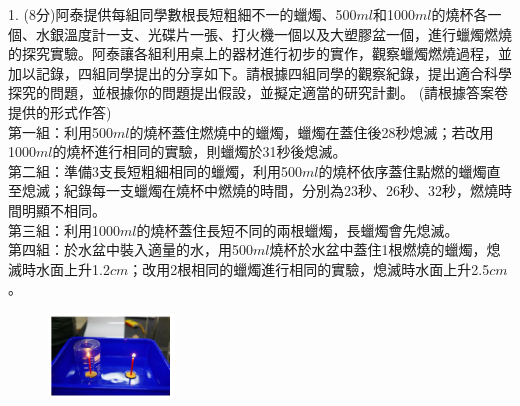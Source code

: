 \documentclass[cn,10pt,math=newtx]{elegantbook}
\begin{document}
\begin{example}
   1. (8分)阿泰提供每組同學數根長短粗細不一的蠟燭、500$ml$和1000$ml$的燒杯各一個、水銀溫度計一支、光碟片一張、打火機一個以及大塑膠盆一個，進行蠟燭燃燒的探究實驗。阿泰讓各組利用桌上的器材進行初步的實作，觀察蠟燭燃燒過程，並加以記錄，四組同學提出的分享如下。請根據四組同學的觀察紀錄，提出適合科學探究的問題，並根據你的問題提出假設，並擬定適當的研究計劃。 (請根據答案卷提供的形式作答)\\
   第一組：利用500$ml$的燒杯蓋住燃燒中的蠟燭，蠟燭在蓋住後28秒熄滅；若改用1000$ml$的燒杯進行相同的實驗，則蠟燭於31秒後熄滅。\\
   第二組：準備3支長短粗細相同的蠟燭，利用500$ml$的燒杯依序蓋住點燃的蠟燭直至熄滅；紀錄每一支蠟燭在燒杯中燃燒的時間，分別為23秒、26秒、32秒，燃燒時間明顯不相同。\\
   第三組：利用1000$ml$的燒杯蓋住長短不同的兩根蠟燭，長蠟燭會先熄滅。\\
   第四組：於水盆中裝入適量的水，用500$ml$燒杯於水盆中蓋住1根燃燒的蠟燭，熄滅時水面上升1.2$cm$；改用2根相同的蠟燭進行相同的實驗，熄滅時水面上升2.5$cm$。\\
    \rightline{[中壢高中教甄109]}
\end{example}
\begin{solution}
    
\end{solution}
\begin{figure}[htbp]
    \flushright
    \includegraphics[width=0.3\textwidth]{image/109中壢221.png}
  \end{figure}
\newpage
\end{document}
